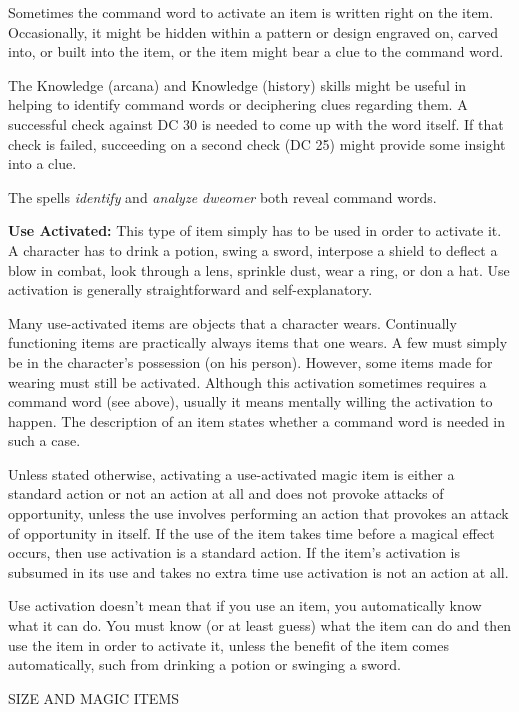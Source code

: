 Sometimes the command word to activate an item is written right on the item. Occasionally, 
it might be hidden within a pattern or design engraved on, carved into, or built 
into the item, or the item might bear a clue to the command word.

The Knowledge (arcana) and Knowledge (history) skills might be useful in helping 
to identify command words or deciphering clues regarding them. A successful check 
against DC 30 is needed to come up with the word itself. If that check is failed, 
succeeding on a second check (DC 25) might provide some insight into a clue.

The spells \textit{identify }and \textit{analyze dweomer }both reveal command words.

\textbf{Use Activated:} This type of item simply has to be used in order to activate 
it. A character has to drink a potion, swing a sword, interpose a shield to deflect 
a blow in combat, look through a lens, sprinkle dust, wear a ring, or don a hat. 
Use activation is generally straightforward and self-explanatory.

Many use-activated items are objects that a character wears. Continually functioning 
items are practically always items that one wears. A few must simply be in the 
character's possession (on his person). However, some items made for wearing\textit{ 
}must still be activated. Although this activation sometimes requires a command 
word (see above), usually it means mentally willing the activation to happen. The 
description of an item states whether a command word is needed in such a case.

Unless stated otherwise, activating a use-activated magic item is either a standard 
action or not an action at all and does not provoke attacks of opportunity, unless 
the use involves performing an action that provokes an attack of opportunity in 
itself. If the use of the item takes time before a magical effect occurs, then 
use activation is a standard action. If the item's activation is subsumed in its 
use and takes no extra time use activation is not an action at all.

Use activation doesn't mean that if you use an item, you automatically know what 
it can do. You must know (or at least guess) what the item can do and then use 
the item in order to activate it, unless the benefit of the item comes automatically, 
such from drinking a potion or swinging a sword.

\vspace{12pt}
{\large SIZE AND MAGIC ITEMS}

